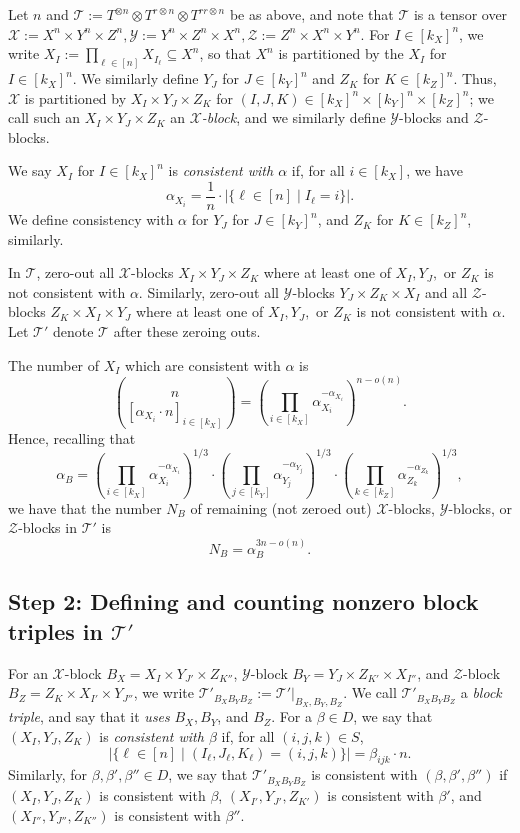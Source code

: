 \documentclass{theoretics}
\newcommand{\T}{\mathcal{T}}
\newcommand{\X}{\mathcal{X}}
\newcommand{\Y}{\mathcal{Y}}
\newcommand{\Z}{\mathcal{Z}}
\begin{document}
Let $n$ and $\T := T^{\otimes n} \otimes T^{r \otimes n} \otimes T^{rr \otimes n}$ be as above, and note that $\T$ is a tensor over $\X := X^n \times Y^n \times Z^n, \Y := Y^n \times Z^n \times X^n, \Z := Z^n \times X^n \times Y^n$. For $I \in [k_X]^n$, we write $X_I := \prod_{\ell \in [n]} X_{I_\ell} \subseteq X^n$, so that $X^n$ is partitioned by the $X_I$ for $I \in [k_X]^n$. We similarly define $Y_J$ for $J \in [k_Y]^n$ and $Z_K$ for $K \in [k_Z]^n$. Thus, $\X$ is partitioned by $X_I \times Y_J \times Z_K$ for $(I,J,K) \in [k_X]^n \times [k_Y]^n \times [k_Z]^n$; we call such an $X_I \times Y_J \times Z_K$ an \emph{$\X$-block}, and we similarly define $\Y$-blocks and $\Z$-blocks.

We say $X_I$ for $I \in [k_X]^n$ is \emph{consistent with $\alpha$} if, for all $i \in [k_X]$, we have $$\alpha_{X_i} = \frac{1}{n} \cdot | \{ \ell \in [n] \mid I_\ell = i \} |.$$ We define consistency with $\alpha$ for $Y_J$ for $J \in [k_Y]^n$, and $Z_K$ for $K \in [k_Z]^n$, similarly.

In $\T$, zero-out all $\X$-blocks $X_I \times Y_J \times Z_K$ where at least one of $X_I,Y_J,$ or $Z_K$ is not consistent with $\alpha$. Similarly, zero-out all $\Y$-blocks $Y_J \times Z_K \times X_I$ and all $\Z$-blocks $Z_K \times X_I \times Y_J$ where at least one of $X_I,Y_J,$ or $Z_K$ is not consistent with $\alpha$. Let $\T'$ denote $\T$ after these zeroing outs.

The number of $X_I$ which are consistent with $\alpha$ is $$\binom{n}{[\alpha_{X_i}\cdot n]_{i \in [k_X]}} = \left( \prod_{i \in [k_X]} \alpha_{X_i}^{-\alpha_{X_i}} \right)^{n - o(n)}.$$
Hence, recalling that $$\alpha_B = \left( \prod_{i \in [k_X]} \alpha_{X_i}^{-\alpha_{X_i}} \right)^{1/3} \cdot \left( \prod_{j \in [k_Y]} \alpha_{Y_j}^{-\alpha_{Y_j}} \right)^{1/3} \cdot \left( \prod_{k \in [k_Z]} \alpha_{Z_k}^{-\alpha_{Z_k}} \right)^{1/3},$$ we have that the number $N_B$ of remaining (not zeroed out) $\X$-blocks, $\Y$-blocks, or $\Z$-blocks in $\T'$ is $$N_B = \alpha_B^{3n - o(n)}.$$

\subsection{Step 2: Defining and counting nonzero block triples in \texorpdfstring{$\T'$}{T'}}

For an $\X$-block $B_X = X_I \times Y_{J'} \times Z_{K''}$, $\Y$-block $B_Y = Y_{J} \times Z_{K'} \times X_{I''}$, and $\Z$-block $B_Z = Z_{K} \times X_{I'} \times Y_{J''}$, we write $\T'_{B_X B_Y B_Z} := \T'|_{B_X,B_Y,B_Z}$. We call $\T'_{B_X B_Y B_Z} $ a \emph{block triple}, and say that it \emph{uses} $B_X,B_Y$, and $B_Z$. For a $\beta \in D$, we say that $(X_I,Y_J,Z_K)$ is \emph{consistent with $\beta$} if, for all $(i,j,k) \in S$,
$$|\{ \ell \in [n] \mid (I_\ell,J_\ell,K_\ell)=(i,j,k) \}| = \beta_{ijk} \cdot n.$$
Similarly, for $\beta, \beta', \beta'' \in D$, we say that $\T'_{B_X B_Y B_Z}$ is consistent with $(\beta,\beta',\beta'')$ if $(X_I,Y_J,Z_K)$ is consistent with $\beta$, $(X_{I'},Y_{J'},Z_{K'})$ is consistent with $\beta'$, and $(X_{I''},Y_{J''},Z_{K''})$ is consistent with $\beta''$.
\end{document}

